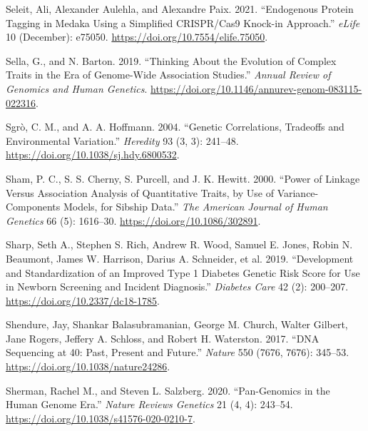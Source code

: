 \documentclass[
]{book}
\newlength{\cslhangindent}
\newlength{\cslentryspacingunit} %
\newenvironment{CSLReferences}[2] %
 {%
  \setlength{\parindent}{0pt}
  \ifodd #1
  \let\oldpar\par
  \def\par{\hangindent=\cslhangindent\oldpar}
  \fi
  \setlength{\parskip}{#2\cslentryspacingunit}
 }%
 {}
\begin{document}
\begin{CSLReferences}{1}{0}
\leavevmode{}%
Seleit, Ali, Alexander Aulehla, and Alexandre Paix. 2021. {``Endogenous Protein Tagging in Medaka Using a Simplified {CRISPR}/{Cas9} Knock-in Approach.''} \emph{eLife} 10 (December): e75050. \url{https://doi.org/10.7554/elife.75050}.

\leavevmode{}%
Sella, G., and N. Barton. 2019. {``Thinking {About} the {Evolution} of {Complex Traits} in the {Era} of {Genome-Wide Association Studies}.''} \emph{Annual Review of Genomics and Human Genetics}. \url{https://doi.org/10.1146/annurev-genom-083115-022316}.

\leavevmode{}%
Sgrò, C. M., and A. A. Hoffmann. 2004. {``Genetic Correlations, Tradeoffs and Environmental Variation.''} \emph{Heredity} 93 (3, 3): 241--48. \url{https://doi.org/10.1038/sj.hdy.6800532}.

\leavevmode{}%
Sham, P. C., S. S. Cherny, S. Purcell, and J. K. Hewitt. 2000. {``Power of {Linkage} Versus {Association Analysis} of {Quantitative Traits}, by {Use} of {Variance-Components Models}, for {Sibship Data}.''} \emph{The American Journal of Human Genetics} 66 (5): 1616--30. \url{https://doi.org/10.1086/302891}.

\leavevmode{}%
Sharp, Seth A., Stephen S. Rich, Andrew R. Wood, Samuel E. Jones, Robin N. Beaumont, James W. Harrison, Darius A. Schneider, et al. 2019. {``Development and {Standardization} of an {Improved Type} 1 {Diabetes Genetic Risk Score} for {Use} in {Newborn Screening} and {Incident Diagnosis}.''} \emph{Diabetes Care} 42 (2): 200--207. \url{https://doi.org/10.2337/dc18-1785}.

\leavevmode{}%
Shendure, Jay, Shankar Balasubramanian, George M. Church, Walter Gilbert, Jane Rogers, Jeffery A. Schloss, and Robert H. Waterston. 2017. {``{DNA} Sequencing at 40: Past, Present and Future.''} \emph{Nature} 550 (7676, 7676): 345--53. \url{https://doi.org/10.1038/nature24286}.

\leavevmode{}%
Sherman, Rachel M., and Steven L. Salzberg. 2020. {``Pan-Genomics in the Human Genome Era.''} \emph{Nature Reviews Genetics} 21 (4, 4): 243--54. \url{https://doi.org/10.1038/s41576-020-0210-7}.


\end{CSLReferences}
\end{document}
